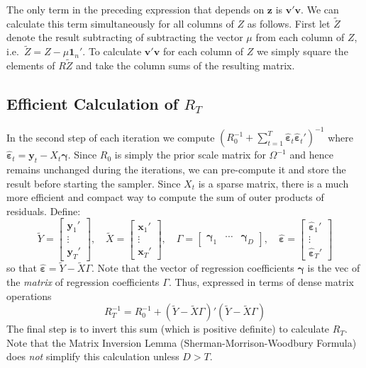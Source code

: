 \documentclass[12pt]{article}
\begin{document}
The only term in the preceding expression that depends on $\mathbf{z}$ is $\mathbf{v}'\mathbf{v}$.
We can calculate this term simultaneously for all columns of $Z$ as follows.
First let $\widetilde{Z}$ denote the result subtracting of subtracting the vector $\mu$ from each column of $Z$, i.e.\ $\widetilde{Z} = Z - \mu \mathbf{1}_n'$.
To calculate $\mathbf{v}'\mathbf{v}$ for each column of $Z$ we simply square the elements of $R\widetilde{Z}$ and take the column sums of the resulting matrix.


\subsection{Efficient Calculation of $R_T$}
In the second step of each iteration we compute 
$\left( R_0^{-1} + \sum_{t=1}^{T} \hat{\boldsymbol{\varepsilon}}_t\hat{\boldsymbol{\varepsilon}}_t'\right)^{-1}$ 
where 
$\hat{\boldsymbol{\varepsilon}}_t=\mathbf{y}_t - X_t \boldsymbol{\gamma}$.
Since $R_0$ is simply the prior scale matrix for $\Omega^{-1}$ and hence remains unchanged during the iterations, we can pre-compute it and store the result before starting the sampler.
Since $X_t$ is a sparse matrix, there is a much more efficient and compact way to compute the sum of outer products of residuals.
Define:
\begin{equation*}
  \widetilde{Y} = \left[
  \begin{array}{c}
    \mathbf{y}_1'\\
    \vdots \\
    \mathbf{y}_T'
  \end{array}
\right], \quad \widetilde{X} = \left[
\begin{array}{c}
  \mathbf{x}_{1}' \\
  \vdots \\
  \mathbf{x}_{T}' 
\end{array}
\right], \quad \Gamma = \left[
\begin{array}{ccc}
  \boldsymbol{\gamma}_1 & \cdots & \boldsymbol{\gamma}_D
\end{array}
\right], \quad \hat{\boldsymbol{\varepsilon}} = \left[
\begin{array}{c}
  \hat{\boldsymbol{\varepsilon}}_1' \\
  \vdots \\
  \hat{\boldsymbol{\varepsilon}}_T'
\end{array}
\right]
\end{equation*}
so that $\hat{\boldsymbol{\varepsilon}} = \widetilde{Y} - \widetilde{X} \Gamma$.
Note that the vector of regression coefficients $\boldsymbol{\gamma}$ is the vec of the \emph{matrix} of regression coefficients $\Gamma$. 
Thus, expressed in terms of dense matrix operations
\begin{equation*}
  R_T^{-1} =  R_0^{-1} + \left( \widetilde{Y} - \widetilde{X} \Gamma \right)'\left( \widetilde{Y} - \widetilde{X} \Gamma \right)
\end{equation*}
The final step is to invert this sum (which is positive definite) to calculate $R_T$.
Note that the Matrix Inversion Lemma (Sherman-Morrison-Woodbury Formula) does \emph{not} simplify this calculation unless $D > T$.
\end{document}
